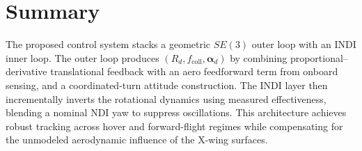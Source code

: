 \section{Summary}\label{sec:ctrl-summary}
The proposed control system stacks a geometric $SE(3)$ outer loop with an INDI inner loop.
The outer loop produces $(R_d,f_{\text{coll}},\boldsymbol{\alpha}_d)$ by combining
proportional–derivative translational feedback with an aero feedforward term from onboard sensing,
and a coordinated-turn attitude construction.
The INDI layer then incrementally inverts the rotational dynamics using measured effectiveness,
blending a nominal NDI yaw to suppress oscillations.
This architecture achieves robust tracking across hover and forward-flight regimes while compensating
for the unmodeled aerodynamic influence of the X-wing surfaces.


